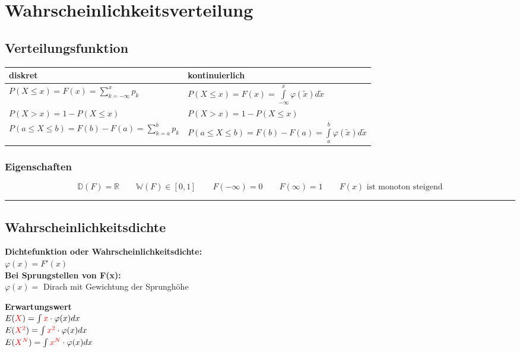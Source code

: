\section{Wahrscheinlichkeitsverteilung}

	\subsection{Verteilungsfunktion  }
		\begin{tabular}[]{|l|l|}
        	\hline
        	\textbf{diskret} & \textbf{kontinuierlich}\\
        	\hline
        	\hline
        	$P(X\leq x)=F(x)=\sum\limits_{k=-\infty}^x p_k$ &
        	$P(X\leq x)=F(x)=\int\limits_{-\infty}^x
        	\varphi(\tilde{x})d\tilde{x}$\\
  			$P(X>x)=1-P(X\leq x)$ & $P(X>x)=1-P(X\leq x)$\\        	
        	$P(a \le X \leq b)=F(b)-F(a)=\sum\limits_{k=a}^b p_k$ &
  			$P(a \le X \leq b)=F(b)-F(a)=\int \limits_a^b
  			\varphi(\tilde{x})d\tilde{x}$\\
        	\hline
        \end{tabular}

		\subsubsection{Eigenschaften}
  				$$\boxed{\mathbb{D}(F) = \mathbb{R}} \qquad \boxed{\mathbb{W}(F)
  				\in[0,1]} \qquad \boxed{F(-\infty)=0} \qquad  \boxed{F(\infty)=1}
  				\qquad \boxed{F(x) \text{ ist monoton steigend}}$$

\hrule

\subsection{Wahrscheinlichkeitsdichte }
\begin{multicols}{2}
\textbf{Dichtefunktion oder Wahrscheinlichkeitsdichte:} \\
$\varphi(x) = F'(x)$ \\
\textbf{Bei Sprungstellen von F(x):} \\
$\varphi(x) = $ Dirach mit Gewichtung der Sprunghöhe

\columnbreak

\textbf{Erwartungswert} \\
$E(\textcolor{red}{X}) = \int \textcolor{red}{x} \cdot \varphi(x) dx$ \\
$E(\textcolor{red}{X^2}) = \int \textcolor{red}{x^2} \cdot \varphi(x) dx$ \\
$E(\textcolor{red}{X^N}) = \int \textcolor{red}{x^N} \cdot \varphi(x) dx$ 
\end{multicols}

